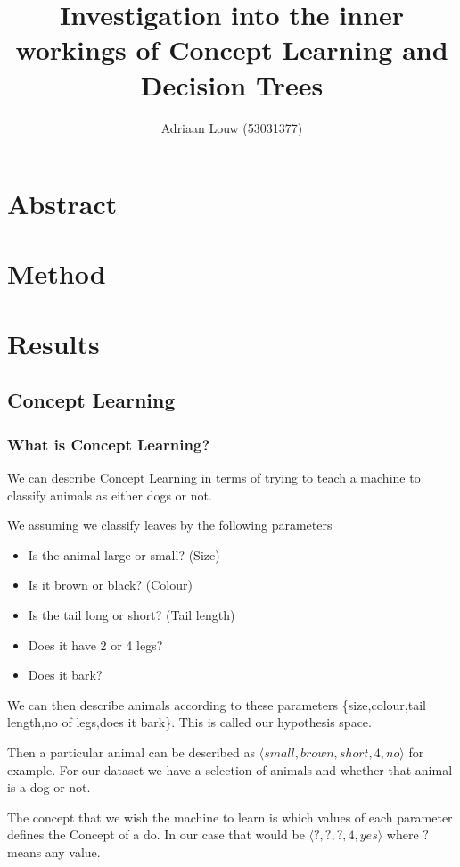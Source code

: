 \documentclass[10pt,a4paper]{article}
\title{Investigation into the inner workings of Concept Learning and Decision Trees}
\author{ Adriaan Louw (53031377)}
\begin{document}
\maketitle

\tableofcontents

\section{Abstract}

\section{Method}

\section{Results}
\subsection{Concept Learning}
\subsubsection{What is Concept Learning?}
We can describe Concept Learning in terms of trying to teach a machine to classify animals as either dogs or not.

We assuming we classify leaves by the following parameters
\begin{itemize}
\item Is the animal large or small? (Size)
\item Is it brown or black? (Colour)
\item Is the tail long or short? (Tail length)
\item Does it have 2 or 4 legs?
\item Does it bark?
\end{itemize}

We can then describe animals according to these parameters
\{size,colour,tail length,no of legs,does it bark\}. This is called our hypothesis space.

Then a particular animal can be described as $\langle small, brown, short, 4, no\rangle$ for example. For our dataset we have a selection of animals and whether that animal is a dog or not.

The concept that we wish the machine to learn is which values of each parameter defines the Concept of a do. In our case that would be $\langle ?, ?, ?, 4, yes\rangle $ where $?$ means any value.
\end{document}
